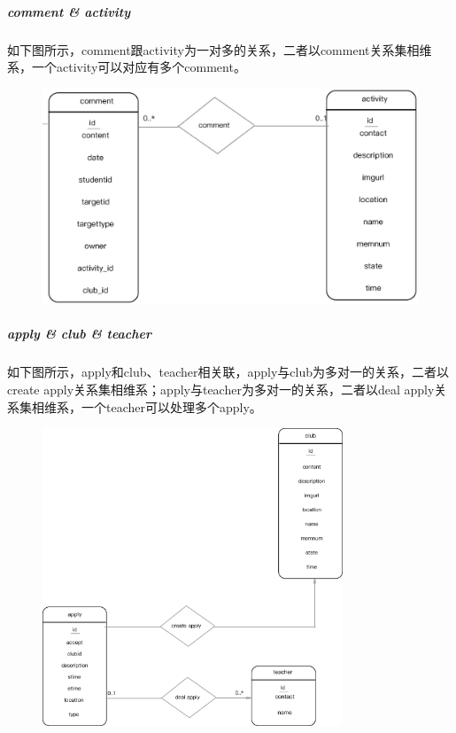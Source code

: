 \documentclass[UTF8]{ctexart}
\begin{document}
\subparagraph{comment \& activity}
如下图所示，comment跟activity为一对多的关系，二者以comment关系集相维系，一个activity可以对应有多个comment。
\newline
\begin{figure}[H]
\centering
\includegraphics[width = 1.0\textwidth]{activity-comment-er.eps}
\end{figure}

\subparagraph{apply \& club \& teacher}
如下图所示，apply和club、teacher相关联，apply与club为多对一的关系，二者以create apply关系集相维系；apply与teacher为多对一的关系，二者以deal apply关系集相维系，一个teacher可以处理多个apply。
\newline
\begin{figure}[H]
\centering
\includegraphics[width = 0.8\textwidth]{apply-*-er.eps}
\end{figure}
\end{document}
